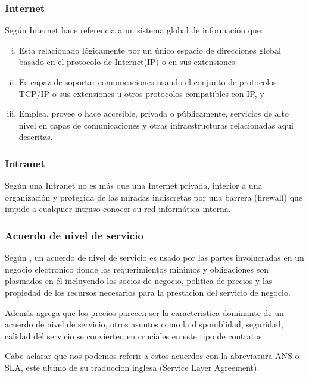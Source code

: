\subsubsection{Internet}
Según \cite{fnc} Internet hace referencia a un sistema global de información que:
\begin{enumerate}[i.]
    \item Esta relacionado lógicamente por un único espacio de direcciones
          global basado en el protocolo de Internet(IP) o en sus extensiones
    \item Es capaz de soportar comunicaciones usando el conjunto de protocolos TCP/IP
          o sus extensiones u otros protocolos compatibles con IP, y
    \item Emplea, provee o hace accesible, privada o públicamente, servicios de
          alto nivel en capas de comunicaciones y otras infraestructuras relacionadas
          aqui descritas.
\end{enumerate}
\subsubsection{Intranet}
Según \cite{lafrance} una Intranet no es más que una Internet privada, interior a una
organización y protegida de las miradas indiscretas por una barrera (firewall) que
impide a cualquier intruso conocer su red informática interna.
\subsubsection{Acuerdo de nivel de servicio}
Según \cite{qianq}, un acuerdo de nivel de servicio es usado por las partes
involucradas en un negocio electronico donde los requerimientos minimos y obligaciones son
plasmados en él incluyendo los socios de negocio, politica de precios y las propiedad
de los recursos necesarios para la prestacion del servicio de negocio.

Además \cite{qianq} agrega que los precios parecen ser la caracteristica dominante
de un acuerdo de nivel de servicio, otros asuntos como la disponiblidad, seguridad,
calidad del servicio se convierten en cruciales en este tipo de contratos.

Cabe aclarar que nos podemos referir a estos acuerdos con la abreviatura ANS o SLA,
este ultimo de su traduccion inglesa (Service Layer Agreement).

